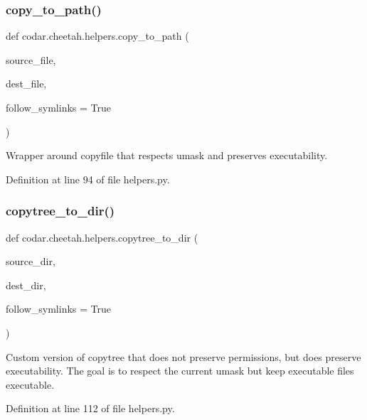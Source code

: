 \subsubsection{\texorpdfstring{copy\+\_\+to\+\_\+path()}{copy\_to\_path()}}
{\footnotesize\ttfamily def codar.\+cheetah.\+helpers.\+copy\+\_\+to\+\_\+path (\begin{DoxyParamCaption}\item[{}]{source\+\_\+file,  }\item[{}]{dest\+\_\+file,  }\item[{}]{follow\+\_\+symlinks = {\ttfamily True} }\end{DoxyParamCaption})}

\begin{DoxyVerb}Wrapper around copyfile that respects umask and preserves
executability.\end{DoxyVerb}
 

Definition at line 94 of file helpers.\+py.

\mbox{\label{namespacecodar_1_1cheetah_1_1helpers_a5699ff92469c138e5d44f6d64b505a11}} 
\subsubsection{\texorpdfstring{copytree\+\_\+to\+\_\+dir()}{copytree\_to\_dir()}}
{\footnotesize\ttfamily def codar.\+cheetah.\+helpers.\+copytree\+\_\+to\+\_\+dir (\begin{DoxyParamCaption}\item[{}]{source\+\_\+dir,  }\item[{}]{dest\+\_\+dir,  }\item[{}]{follow\+\_\+symlinks = {\ttfamily True} }\end{DoxyParamCaption})}

\begin{DoxyVerb}Custom version of copytree that does not preserve permissions, but
does preserve executability. The goal is to respect the current umask
but keep executable files executable.\end{DoxyVerb}
 

Definition at line 112 of file helpers.\+py.

\mbox{\label{namespacecodar_1_1cheetah_1_1helpers_a6dc162915bc1fde0814a35a63c6baacf}} 
